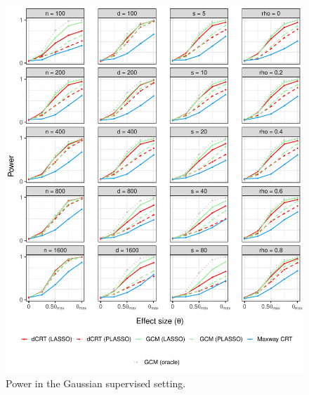 \documentclass[aos]{imsart}
\theoremstyle{definition}
\theoremstyle{remark}
\begin{document}
\begin{figure}[!ht]
	\centering
	\includegraphics[width = \textwidth]{figures/gaussian_supervised_setting_alternative.pdf}
	\caption{Power in the Gaussian supervised setting.}
	\label{fig:gaussian_supervised_alternative}
\end{figure}
\end{document}
